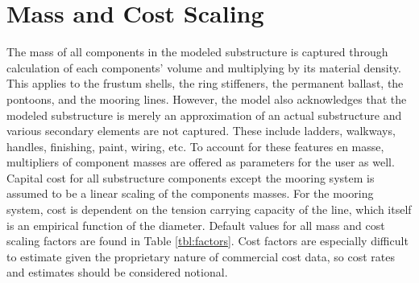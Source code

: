 \section{Mass and Cost Scaling}
The mass of all components in the modeled substructure is captured
through calculation of each components' volume and multiplying by its material
density.  This applies to the frustum shells, the ring stiffeners, the
permanent ballast, the pontoons, and the mooring lines.
However, the model also acknowledges that the modeled substructure is
merely an approximation of an actual substructure and various secondary
elements are not captured.  These include ladders, walkways, handles,
finishing, paint, wiring, etc.  To account for these features en masse,
multipliers of component masses are offered as parameters for the user
as well.  Capital cost for all substructure components except the
mooring system is assumed to be a linear scaling of the components
masses.  For the mooring system, cost is dependent on the tension
carrying capacity of the line, which itself is an empirical function of
the diameter.  Default values for all mass and cost scaling factors are
found in Table \ref{tbl:factors}.  Cost factors are especially difficult to
estimate given the proprietary nature of commercial cost data, so
cost rates and estimates should be considered notional.
%
